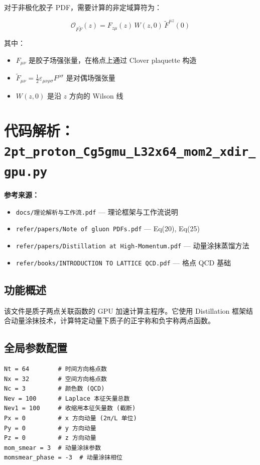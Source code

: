 \documentclass[12pt,a4paper]{ctexart}
\begin{document}
对于非极化胶子 PDF，需要计算的非定域算符为：

\begin{equation}
\mathcal{O}_{F\tilde{F}}(z) = F_{z\mu}(z) \, W(z, 0) \, \tilde{F}^{\mu z}(0)
\end{equation}

其中：
\begin{itemize}
    \item $F_{\mu\nu}$ 是胶子场强张量，在格点上通过 Clover plaquette 构造
    \item $\tilde{F}_{\mu\nu} = \frac{1}{2}\varepsilon_{\mu\nu\rho\sigma}F^{\rho\sigma}$ 是对偶场强张量
    \item $W(z, 0)$ 是沿 $z$ 方向的 Wilson 线
\end{itemize}

\section{代码解析：\texttt{2pt\_proton\_Cg5gmu\_L32x64\_mom2\_xdir\_gpu.py}}
\label{sec:2pt}

\textbf{参考来源：}
\begin{itemize}
    \item \texttt{docs/理论解析与工作流.pdf} — 理论框架与工作流说明
    \item \texttt{refer/papers/Note of gluon PDFs.pdf} — Eq(20), Eq(25)
    \item \texttt{refer/papers/Distillation at High-Momentum.pdf} — 动量涂抹蒸馏方法
    \item \texttt{refer/books/INTRODUCTION TO LATTICE QCD.pdf} — 格点 QCD 基础
\end{itemize}

\subsection{功能概述}

该文件是质子两点关联函数的 GPU 加速计算主程序。它使用 Distillation 框架结合动量涂抹技术，计算特定动量下质子的正宇称和负宇称两点函数。

\subsection{全局参数配置}

\begin{lstlisting}[caption={全局参数配置}]
Nt = 64        # 时间方向格点数
Nx = 32        # 空间方向格点数
Nc = 3         # 颜色数 (QCD)
Nev = 100      # Laplace 本征矢量总数
Nev1 = 100     # 收缩用本征矢量数 (截断)
Px = 0         # x 方向动量 (2π/L 单位)
Py = 0         # y 方向动量
Pz = 0         # z 方向动量
mom_smear = 3  # 动量涂抹参数
momsmear_phase = -3  # 动量涂抹相位
\end{lstlisting}
\end{document}
